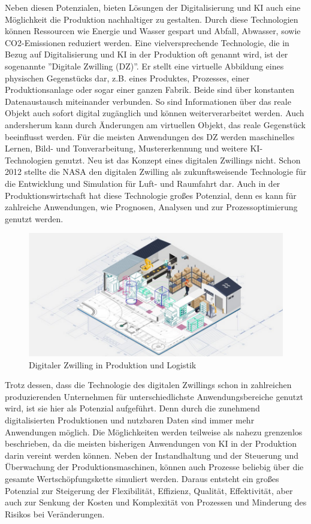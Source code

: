 \documentclass[a4paper,12pt, german]{report}
\begin{document}
Neben diesen Potenzialen, bieten Lösungen der Digitalisierung und KI auch eine Möglichkeit die Produktion nachhaltiger zu gestalten. Durch diese Technologien können Ressourcen wie Energie und Wasser gespart und Abfall, Abwasser, sowie CO2-Emissionen reduziert werden.\cite{36}\newline
Eine vielversprechende Technologie, die in Bezug auf Digitalisierung und KI in der Produktion oft genannt wird, ist der sogenannte ''Digitale Zwilling (DZ)''. Er stellt eine virtuelle Abbildung eines physischen Gegenstücks dar, z.B. eines Produktes, Prozesses, einer Produktionsanlage oder sogar einer ganzen Fabrik. Beide sind über konstanten Datenaustausch miteinander verbunden. So sind Informationen über das reale Objekt auch sofort digital zugänglich und können weiterverarbeitet werden. Auch andersherum kann durch Änderungen am virtuellen Objekt, das reale Gegenstück beeinflusst werden. Für die meisten Anwendungen des DZ werden maschinelles Lernen, Bild- und Tonverarbeitung, Mustererkennung und weitere KI-Technologien genutzt.
Neu ist das Konzept eines digitalen Zwillings nicht. Schon 2012 stellte die NASA den digitalen Zwilling als zukunftsweisende Technologie für die Entwicklung und Simulation für Luft- und Raumfahrt dar. Auch in der Produktionswirtschaft hat diese Technologie großes Potenzial, denn es kann für zahlreiche Anwendungen, wie Prognosen, Analysen und zur Prozessoptimierung genutzt werden.\cite{32}

\begin{figure}
  \center
 \includegraphics[width=12cm]{images/DZ.png}
  \caption[Digitaler Zwilling in Produktion und Logistik]{Digitaler Zwilling in Produktion und Logistik \cite{34}}
\end{figure}

Trotz dessen, dass die Technologie des digitalen Zwillings schon in zahlreichen produzierenden Unternehmen für unterschiedlichste Anwendungsbereiche genutzt wird, ist sie hier als Potenzial aufgeführt. Denn durch die zunehmend digitalisierten Produktionen und nutzbaren Daten sind immer mehr Anwendungen möglich. Die Möglichkeiten werden teilweise als nahezu grenzenlos beschrieben, da die meisten bisherigen Anwendungen von KI in der Produktion darin vereint werden können. Neben der Instandhaltung und der Steuerung und Überwachung der Produktionsmaschinen, können auch Prozesse beliebig über die gesamte Wertschöpfungskette simuliert werden. Daraus entsteht ein großes Potenzial zur Steigerung der Flexibilität, Effizienz, Qualität, Effektivität, aber auch zur Senkung der Kosten und Komplexität von Prozessen und Minderung des Risikos bei Veränderungen.\cite{33}
\end{document}
